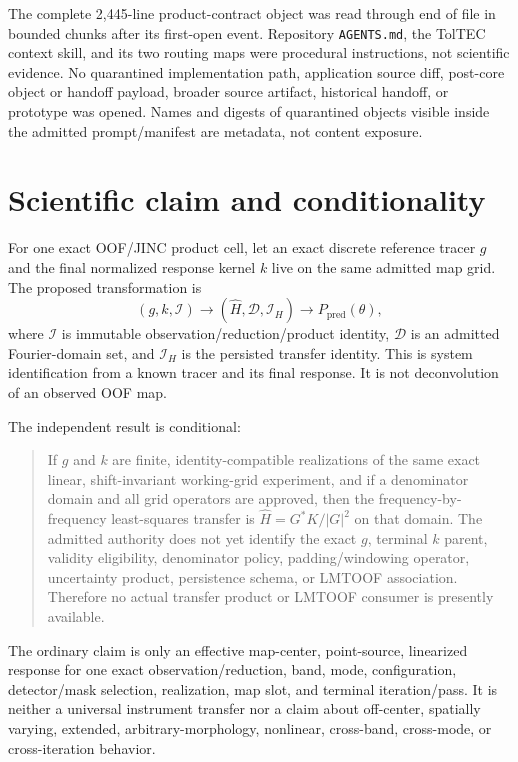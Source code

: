 \documentclass[11pt]{article}
\begin{document}
The complete 2,445-line product-contract object was read through end of file in
bounded chunks after its first-open event.  Repository \texttt{AGENTS.md}, the
TolTEC context skill, and its two routing maps were procedural instructions,
not scientific evidence.  No quarantined implementation path, application
source diff, post-core object or handoff payload, broader source artifact,
historical handoff, or prototype was opened.  Names and digests of quarantined
objects visible inside the admitted prompt/manifest are metadata, not content
exposure.

\section{Scientific claim and conditionality}

For one exact OOF/JINC product cell, let an exact discrete reference tracer
$g$ and the final normalized response kernel $k$ live on the same admitted map
grid.  The proposed transformation is
\[
 (g,k,\mathcal I) \longrightarrow (\widehat H,\mathcal D,\mathcal I_H)
 \longrightarrow P_{\mathrm{pred}}(\theta),
\]
where $\mathcal I$ is immutable observation/reduction/product identity,
$\mathcal D$ is an admitted Fourier-domain set, and $\mathcal I_H$ is the
persisted transfer identity.  This is system identification from a known
tracer and its final response.  It is not deconvolution of an observed OOF map.

The independent result is conditional:

\begin{quote}
If $g$ and $k$ are finite, identity-compatible realizations of the same exact
linear, shift-invariant working-grid experiment, and if a denominator domain
and all grid operators are approved, then the frequency-by-frequency
least-squares transfer is $\widehat H=G^*K/|G|^2$ on that domain.  The admitted
authority does not yet identify the exact $g$, terminal $k$ parent, validity
eligibility, denominator policy, padding/windowing operator, uncertainty
product, persistence schema, or LMTOOF association.  Therefore no actual
transfer product or LMTOOF consumer is presently available.
\end{quote}

The ordinary claim is only an effective map-center, point-source,
linearized response for one exact observation/reduction, band, mode,
configuration, detector/mask selection, realization, map slot, and terminal
iteration/pass.  It is neither a universal instrument transfer nor a claim
about off-center, spatially varying, extended, arbitrary-morphology, nonlinear,
cross-band, cross-mode, or cross-iteration behavior.
\end{document}
